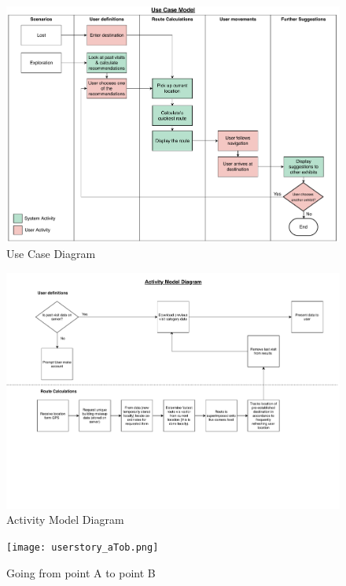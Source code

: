 \begin{figure}[H]
    \centering
    \includegraphics[width=\textwidth]
    {assets/use_case.pdf}
    \caption{Use Case Diagram}
    \label{fig:Use Case Diagram}
\end{figure}

\begin{figure}[H]
    \centering
    \includegraphics[angle=90, width=\textwidth]
    {assets/Activity_Diagram.pdf}
    \caption{Activity Model Diagram}
    \label{fig:Activity Model Diagram}
\end{figure}

\begin{figure}[H]
    \centering
    \texttt{[image: userstory\_aTob.png]}
    \caption{Going from point A to point B}
    \label{fig:AtoB}
\end{figure}

